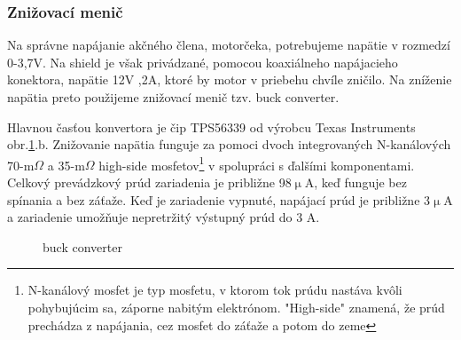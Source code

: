 \subsubsection{Znižovací menič}
\label{nap}

Na správne napájanie akčného člena, motorčeka, potrebujeme napätie v rozmedzí 0-3,7V. Na shield je však privádzané, pomocou koaxiálneho napájacieho konektora, napätie 12V ,2A, ktoré by motor v priebehu chvíle zničilo. Na zníženie napätia preto použijeme znižovací menič tzv. buck converter. 

Hlavnou časťou konvertora je čip TPS56339 od výrobcu Texas Instruments obr.\ref{OBRAZOK 2.1}.b. Znižovanie napätia funguje za pomoci dvoch integrovaných N-kanálových 70-m$\Omega$ a 35-m$\Omega$ high-side mosfetov\footnote[4]{N-kanálový mosfet je typ mosfetu, v ktorom tok prúdu nastáva kvôli pohybujúcim sa, záporne nabitým elektrónom. "High-side" znamená, že prúd prechádza z napájania, cez mosfet do záťaže a potom do zeme} v spolupráci s ďalšími komponentami. Celkový prevádzkový prúd zariadenia je približne 98$\upmu$A, keď funguje bez spínania a bez záťaže. Keď je zariadenie vypnuté, napájací prúd je približne 3$\upmu$A a zariadenie umožňuje nepretržitý výstupný prúd do 3 A\cite{buckobr}.

\begin{figure}[!tbh]
	\hfill
	\hfill
	\hfill
	\caption{buck converter}\label{OBRAZOK 2.1}
\end{figure}


